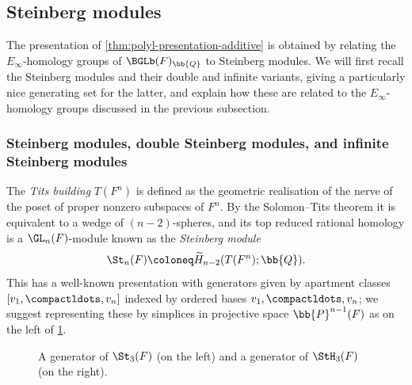 \documentclass[a4paper]{amsart}
\begin{document}

\subsection{Steinberg modules} The presentation of \cref{thm:polyl-presentation-additive} is obtained by relating the $E_\infty$-homology groups of $\BGLb(F)_\bb{Q}$ to Steinberg modules. We will first recall the Steinberg modules and their double and infinite variants, giving a particularly nice generating set for the latter, and explain how these are related to the $E_\infty$-homology groups discussed in the previous subsection.

\subsubsection{Steinberg modules, double Steinberg modules, and infinite Steinberg modules} 

The \emph{Tits building} $T(F^n)$ is defined as the geometric realisation of the nerve of the poset of proper nonzero subspaces of $F^n$. By the Solomon--Tits theorem it is equivalent to a wedge of $(n-2)$-spheres, and its top reduced rational homology is a $\GL_n(F)$-module known as the \emph{Steinberg module}
\[\St_n(F) \coloneq \widetilde{H}_{n-2}(T(F^n);\bb{Q}).\]
This has a well-known presentation with generators given by apartment classes $[v_1,\compactldots,v_n]$ indexed by ordered bases $v_1,\compactldots,v_n$; we suggest representing these by simplices in projective space $\bb{P}^{n-1}(F)$ as on the left of \cref{fig:generators-st-sth}.

\begin{figure}[h]
\qquad {}
\caption{A generator of $\St_3(F)$ (on the left) and a generator of $\StH_3(F)$ (on the right).}
\label{fig:generators-st-sth} 
\end{figure}
\end{document}
